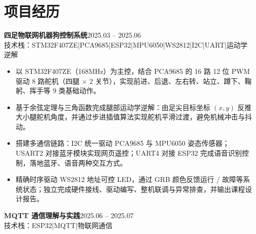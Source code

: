 \documentclass[10pt,a4paper]{article}
\newcommand{\projectblock}[3]{%
    {\bfseries\color{darktext}#1}\hfill{\color{graytext}#2}\\%
    {\small\color{graytext}#3}%
    \vspace{0.2em}%
}
\begin{document}
\section{\faProjectDiagram\hspace{0.4em}项目经历}

\projectblock{四足物联网机器狗控制系统}{2025.03 -- 2025.06}{技术栈：STM32F407ZE\hspace{0.3em}|\hspace{0.3em}PCA9685\hspace{0.3em}|\hspace{0.3em}ESP32\hspace{0.3em}|\hspace{0.3em}MPU6050\hspace{0.3em}|\hspace{0.3em}WS2812\hspace{0.3em}|\hspace{0.3em}I2C\hspace{0.3em}|\hspace{0.3em}UART\hspace{0.3em}|\hspace{0.3em}运动学逆解}

\begin{itemize}[leftmargin=1.5em, itemsep=4pt, parsep=0pt, topsep=4pt]
    \item 以 STM32F407ZE（168MHz）为主控，结合 PCA9685 的 16 路 12 位 PWM 驱动 8 路舵机（四腿 $\times$ 2 关节），实现前进、后退、左右转、站立、蹲下、鞠躬、挥手等 9 类基础动作。
    \item 基于余弦定理与三角函数完成腿部运动学逆解：由足尖目标坐标 $(x, y)$ 反推大小腿舵机角度，并通过步进插值算法实现舵机平滑过渡，避免机械冲击与抖动。
    \item 搭建多通信链路：I2C 统一驱动 PCA9685 与 MPU6050 姿态传感器；USART2 对接蓝牙模块实现网页遥控；UART4 对接 ESP32 完成语音识别控制，落地蓝牙、语音两种交互方式。
    \item 精确时序驱动 WS2812 地址可控 LED，通过 GRB 颜色反馈运行 / 故障等系统状态；独立完成硬件接线、驱动编写、整机联调与异常排查，并输出课程设计报告。
\end{itemize}

\vspace{0.6em}

\projectblock{MQTT 通信理解与实践}{2025.06 -- 2025.07}{技术栈：ESP32\hspace{0.3em}|\hspace{0.3em}MQTT\hspace{0.3em}|\hspace{0.3em}物联网通信}
\end{document}
